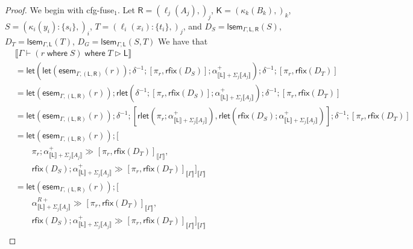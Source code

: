 \documentclass[acmsmall,screen,review]{acmart}
\newcommand{\ms}[1]{\ensuremath{\mathsf{#1}}}
\newcommand{\lto}{:}
\newcommand{\where}[2]{#1\;\ms{where}\;#2}
\newcommand{\wbranch}[3]{#1(#2) \lto \{#3\}}
\newcommand{\haslb}[3]{#1 \vdash #2 \rhd #3}
\newcommand{\brle}[1]{{\textsf{#1}}}
\newcommand{\dnt}[1]{\llbracket{#1}\rrbracket}
\newcommand{\entrymor}[3]{\ms{esem}_{#1, #3}(#2)}
\newcommand{\loopmor}[3]{\ms{lsem}_{#1, #3}(#2)}
\newcommand{\lmor}[1]{\ms{let}(#1)}
\newcommand{\rlmor}[1]{\ms{rlet}(#1)}
\newcommand{\rfix}[1]{\ms{rfix}(#1)}
\newcommand{\rseq}[3]{#2 \gg_{#1} #3}
\newcommand{\envcop}[3]{[#2, #3]_{#1}}
\begin{document}
\begin{proof}
  We begin with \brle{cfg-fuse$_1$}. Let %
  $\ms{R} = (\ell_j(A_j),)_j$, $\ms{K} = (\kappa_k(B_k),)_k$, %
  $S = (\wbranch{\kappa_i}{y_i}{s_i},)_i$,
  $T = (\wbranch{\ell_i}{x_i}{t_i},)_j$, and %
  $D_S = \loopmor{\Gamma}{S}{\ms{L}, \ms{R}}$, %
  $D_T = \loopmor{\Gamma}{T}{\ms{L}}$,
  $D_G = \loopmor{\Gamma}{S, T}{\ms{L}}$ %
  We have that
  \begin{equation}
    \begin{aligned}
      & \dnt{\haslb{\Gamma}{\where{(\where{r}{S})}{T}}{\ms{L}}} \\
      & = \lmor{
        \lmor{\entrymor{\Gamma}{r}{(\ms{L}, \ms{R})}} ; \delta^{-1} ;
        [\pi_r, \rfix{D_S}] ;
        \alpha^+_{\dnt{\ms{L}} + \Sigma_j\dnt{A_j}}
      } ; \delta^{-1} ; [\pi_r, \rfix{D_T}] \\
      & = \lmor{\entrymor{\Gamma}{r}{(\ms{L}, \ms{R})}}
        ; \rlmor{\delta^{-1} ; [\pi_r, \rfix{D_S}] ; \alpha^+_{\dnt{\ms{L}} + \Sigma_j\dnt{A_j}}}
        ; \delta^{-1} ; [\pi_r, \rfix{D_T}] \\
      & = \lmor{\entrymor{\Gamma}{r}{(\ms{L}, \ms{R})}}
        ; \delta^{-1}
        ; [
          \rlmor{\pi_r ; \alpha^+_{\dnt{\ms{L}} + \Sigma_j\dnt{A_j}}},
          \rlmor{\rfix{D_S} ; \alpha^+_{\dnt{\ms{L}} + \Sigma_j\dnt{A_j}}}
        ]
        ; \delta^{-1} ; [\pi_r, \rfix{D_T}] \\
      & = \lmor{\entrymor{\Gamma}{r}{(\ms{L}, \ms{R})}}
        ; \envcop{\dnt{\Gamma}}
            { \\ & \qquad
              \rseq{}
                {\pi_r ; \alpha^+_{\dnt{\ms{L}} + \Sigma_j\dnt{A_j}}}
                {\envcop{\dnt{\Gamma}}{\pi_r}{\rfix{D_T}}}
            }
            { \\ & \qquad
              \rseq{}
                {\rfix{D_S} ; \alpha^+_{\dnt{\ms{L}} + \Sigma_j\dnt{A_j}}}
                {\envcop{\dnt{\Gamma}}{\pi_r}{\rfix{D_T}}}
            } \\
      & = \lmor{\entrymor{\Gamma}{r}{(\ms{L}, \ms{R})}}
        ; \envcop{\dnt{\Gamma}}
            { \\ & \qquad
              \rseq{}
                {\alpha^{R+}_{\dnt{\ms{L}} + \Sigma_j\dnt{A_j}}}
                {\envcop{\dnt{\Gamma}}{\pi_r}{\rfix{D_T}}}
            }
            { \\ & \qquad
              \rseq{}
                {\rfix{D_S} ; \alpha^+_{\dnt{\ms{L}} + \Sigma_j\dnt{A_j}}}
                {\envcop{\dnt{\Gamma}}{\pi_r}{\rfix{D_T}}}
            } \\

\end{aligned}
\end{equation}
\end{proof}
\end{document}
